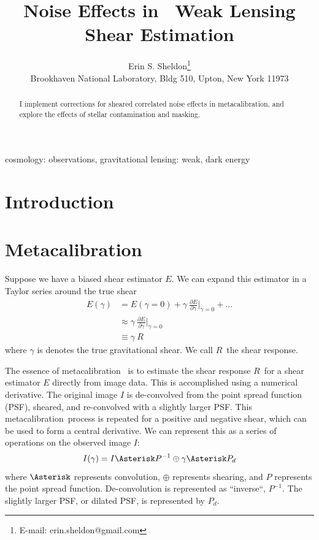 \documentclass[usegraphicx,usenatbib]{mn2e}
\title{Noise Effects in \Mcal\ Weak Lensing Shear Estimation}
\author[Erin S. Sheldon]{Erin S. Sheldon\thanks{E-mail: erin.sheldon@gmail.com}\\
Brookhaven National Laboratory, Bldg 510, Upton, New York 11973}
\newcommand{\mcal}{metacalibration}
\newcommand{\Mcal}{Metacalibration}
\newcommand{\mcalR}{$R$}
\begin{document}
\maketitle

\begin{abstract}

I implement corrections for sheared correlated noise effects in \mcal, and
explore the effects of stellar contamination and masking.   

\end{abstract}


\begin{keywords}                                                                    
    cosmology: observations,
    gravitational lensing: weak,
    dark energy
\end{keywords} 

\section{Introduction} \label{sec:intro}

\section{\Mcal} \label{sec:algo}

Suppose we have a biased shear estimator $E$.  We can expand this estimator
in a Taylor series around the true shear
\begin{align}
    E(\gamma) &= E(\gamma=0) + \gamma ~ \frac{ \partial E }{ \partial \gamma }\bigg|_{\gamma=0}  + ... \nonumber \\
      & \approx  \gamma ~ \frac{ \partial E }{ \partial \gamma } \bigg|_{\gamma=0}  \\
      & \equiv  \gamma ~ \mbox{\mcalR} \nonumber
\end{align}
where $\gamma$ is denotes the true gravitational shear.  We call \mcalR\
the shear response.

The essence of \mcal\ \citep{HuffMcal} is to estimate the shear response
\mcalR\ for a shear estimator $E$ directly from image data.  This is
accomplished using a numerical derivative.  The original image $I$ is
de-convolved from the point spread function (PSF), sheared, and re-convolved
with a slightly larger PSF.  This \mcal\ process is repeated for a
positive and negative shear, which can be used to form a central derivative.
We can represent this as a series of operations on the observed image $I$:
\begin{equation}
    I(\gamma) = I \Asterisk P^{-1} \oplus \gamma \Asterisk P_{d}
\end{equation}
where $\Asterisk$ represents convolution, $\oplus$ represents shearing,
and $P$ represents the point spread function.  De-convolution
is represented as ``inverse``, $P^{-1}$.  The slightly larger PSF, or
dilated PSF, is represented by $P_{d}$.
\end{document}
